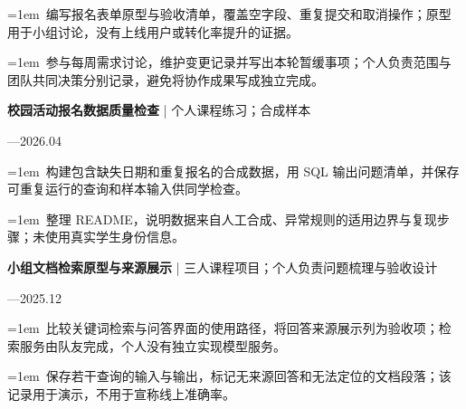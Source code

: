 \documentclass[11pt,a4paper,fontset=fandol]{ctexart}
\begin{document}
\noindent\hangindent=1em\textbullet\ 编写报名表单原型与验收清单，覆盖空字段、重复提交和取消操作；原型用于小组讨论，没有上线用户或转化率提升的证据。\par
\noindent\hangindent=1em\textbullet\ 参与每周需求讨论，维护变更记录并写出本轮暂缓事项；个人负责范围与团队共同决策分别记录，避免将协作成果写成独立完成。\par
\par\medskip{}\par\nobreak
\begin{minipage}{\linewidth}
\textbf{校园活动报名数据质量检查} | 个人课程练习；合成样本\par
{\small{}—2026.04\par}
\noindent\hangindent=1em\textbullet\ 构建包含缺失日期和重复报名的合成数据，用 SQL 输出问题清单，并保存可重复运行的查询和样本输入供同学检查。\par
\end{minipage}\par
\noindent\hangindent=1em\textbullet\ 整理 README，说明数据来自人工合成、异常规则的适用边界与复现步骤；未使用真实学生身份信息。\par
\begin{minipage}{\linewidth}
\textbf{小组文档检索原型与来源展示} | 三人课程项目；个人负责问题梳理与验收设计\par
{\small{}—2025.12\par}
\noindent\hangindent=1em\textbullet\ 比较关键词检索与问答界面的使用路径，将回答来源展示列为验收项；检索服务由队友完成，个人没有独立实现模型服务。\par
\end{minipage}\par
\noindent\hangindent=1em\textbullet\ 保存若干查询的输入与输出，标记无来源回答和无法定位的文档段落；该记录用于演示，不用于宣称线上准确率。\par
\end{document}
